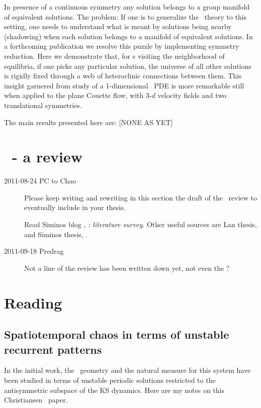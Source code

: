 In presence of a continuous symmetry any solution belongs to a group
manifold of equivalent solutions. The problem: If one is to
generalize the \po\  theory to this setting, one needs to
understand what is meant by solutions being nearby (shadowing) when
each solution belongs to a manifold of equivalent solutions. {In a
forthcoming publication we resolve this puzzle by implementing
symmetry reduction.} Here we demonstrate that, {for \rpo s visiting the
neighborhood of equilibria,} if one picks any
particular solution, the universe of all other solutions is rigidly
fixed through a web of heteroclinic connections between them. This
insight garnered from study of a 1-dimensional \KS\ PDE is more
remarkable still when applied to the plane Couette flow,
with 3-$d$ velocity fields and two translational symmetries.

The main results presented here are: [NONE AS YET]

\section{\KSe\ - a review}
\label{chap:KSreview}

\begin{description}

\item[2011-08-24 PC to Chao]
Please keep writing and rewriting in this section the draft of the
\KSe\ review to eventually include in your thesis.

Read Siminos blog , \emph{ \KS: literature survey}.
Other useful sources are Lan thesis,  and Siminos
thesis, .

\item[2011-09-18 Predrag]  Not a line of the review has been written down
yet, not even the \KSe?

\end{description}


\section{Reading}
\label{s:KSreading}

\subsection{Spatiotemporal chaos in terms of unstable recurrent patterns}
\label{s:Christiansen97}

In the initial work, the \statesp\ geometry and the natural measure for
this system have been
studied in terms of unstable
periodic solutions restricted to the antisymmetric subspace of the
KS dynamics. Here are my notes on this Christiansen \etal\ paper.

